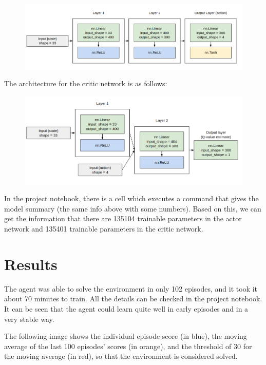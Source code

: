 \documentclass{article}
\begin{document}
\begin{figure}[H]
\centering
\includegraphics[scale=0.45]{img/actor_arch.png}
\label{fig:actor_arch}
\end{figure}

The architecture for the critic network is as follows:

\begin{figure}[H]
\centering
\includegraphics[scale=0.45]{img/critic_arch.png}
\label{fig:critic_arch}
\end{figure}

In the project notebook, there is a cell which executes a command that gives the model summary (the same info above with some numbers). Based on this, we can get the information that there are 135104 trainable parameters in the actor network and 135401 trainable parameters in the critic network.

\section{Results}

The agent was able to solve the environment in only 102 episodes, and it took it about 70 minutes to train. All the details can be checked in the project notebook. It can be seen that the agent could learn quite well in early episodes and in a very stable way.

The following image shows the individual episode score (in blue), the moving average of the last 100 episodes' scores (in orange), and the threshold of 30 for the moving average (in red), so that the environment is considered solved.
\end{document}
